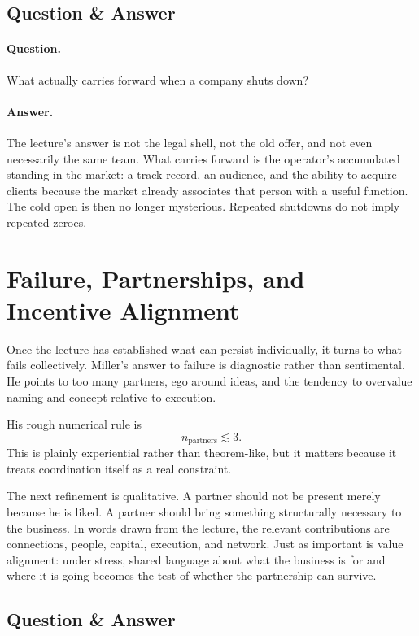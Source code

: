 \subsection{Question \& Answer}

\paragraph{Question.} What actually carries forward when a company shuts down?

\paragraph{Answer.} The lecture's answer is not the legal shell, not the old offer, and not even necessarily the same team. What carries forward is the operator's accumulated standing in the market: a track record, an audience, and the ability to acquire clients because the market already associates that person with a useful function. The cold open is then no longer mysterious. Repeated shutdowns do not imply repeated zeroes.

\section{Failure, Partnerships, and Incentive Alignment}

Once the lecture has established what can persist individually, it turns to what fails collectively. Miller's answer to failure is diagnostic rather than sentimental. He points to too many partners, ego around ideas, and the tendency to overvalue naming and concept relative to execution.

His rough numerical rule is
\begin{equation}
n_{\text{partners}} \lesssim 3.
\end{equation}
This is plainly experiential rather than theorem-like, but it matters because it treats coordination itself as a real constraint.

The next refinement is qualitative. A partner should not be present merely because he is liked. A partner should bring something structurally necessary to the business. In words drawn from the lecture, the relevant contributions are connections, people, capital, execution, and network. Just as important is value alignment: under stress, shared language about what the business is for and where it is going becomes the test of whether the partnership can survive.

\subsection{Question \& Answer}

